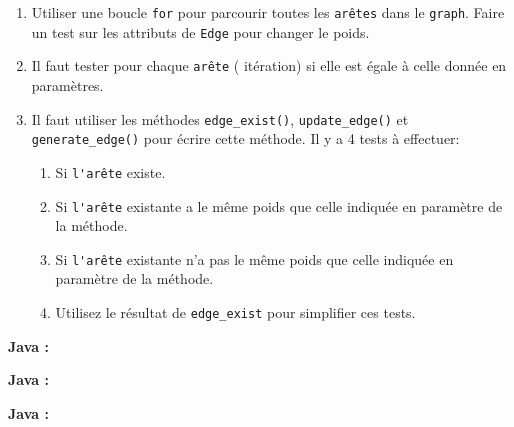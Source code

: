 \begin{Exercice}[20 minutes]
    \begin{conseil}
    \begin{enumerate}
    \item Utiliser une boucle \lstinline{for} pour parcourir toutes les \lstinline{arêtes} dans le \lstinline{graph}. Faire un test sur les attributs de \lstinline{Edge} pour changer le poids.
    \item Il faut tester pour chaque \lstinline{arête} ( itération) si elle  est égale à celle donnée en paramètres.
    \item Il faut utiliser les méthodes \lstinline{edge_exist()}, \lstinline{update_edge()} et \lstinline{generate_edge()} pour écrire cette méthode. Il y a 4 tests à effectuer: 
        \begin{enumerate}
        \item Si \lstinline{l'arête} existe.
        \item Si \lstinline{l'arête} existante a le même poids que celle indiquée en paramètre de la méthode.
        \item Si \lstinline{l'arête} existante n'a pas le même poids que celle indiquée en paramètre de la méthode.
        \item Utilisez le résultat de \lstinline{edge_exist} pour simplifier ces tests.
        \end{enumerate}
    \end{enumerate}
    \end{conseil}
    \begin{solution}
    \textbf{Java :}
         
    \end{solution}
    \begin{solution}
    \textbf{Java :}
         
    \end{solution}
    \begin{solution}
    \textbf{Java :}
         
    \end{solution}

\end{Exercice}

\newpage


